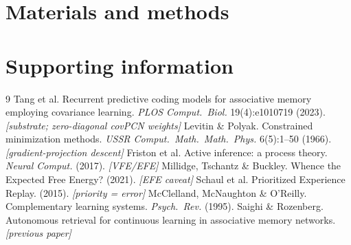 \documentclass[10pt,letterpaper]{article}
\theoremstyle{plain}
\theoremstyle{remark}
\begin{document}
\section*{Materials and methods}

\section*{Supporting information}

\begin{thebibliography}{9}
 Tang et al. Recurrent predictive coding models for associative memory employing covariance learning. \textit{PLOS Comput.\ Biol.} 19(4):e1010719 (2023). \textit{[substrate; zero-diagonal covPCN weights]}
 Levitin \& Polyak. Constrained minimization methods. \textit{USSR Comput.\ Math.\ Math.\ Phys.} 6(5):1--50 (1966). \textit{[gradient-projection descent]}
 Friston et al. Active inference: a process theory. \textit{Neural Comput.} (2017). \textit{[VFE/EFE]}
 Millidge, Tschantz \& Buckley. Whence the Expected Free Energy? (2021). \textit{[EFE caveat]}
 Schaul et al. Prioritized Experience Replay. (2015). \textit{[priority = error]}
 McClelland, McNaughton \& O'Reilly. Complementary learning systems. \textit{Psych.\ Rev.} (1995).
 Saighi \& Rozenberg. Autonomous retrieval for continuous learning in associative memory networks. \textit{[previous paper]}
\end{thebibliography}
\end{document}
